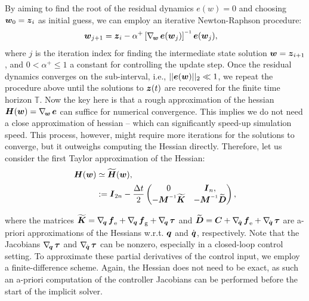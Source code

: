%
By aiming to find the root of the residual dynamics $e(w) = 0$ and choosing ${\boldsymbol{w}}_{0} = {\boldsymbol{z}}_{i}$ as initial guess, we can employ an iterative Newton-Raphson procedure:
%
\begin{align}
\wB_{j+1} & = \zB_i  - \alpha^+ \left[\grad{\wB}\eB(\wB_j)\right]\inv \eB(\wB_{j}),
\end{align}
%
where $j$ is the iteration index for finding the intermediate state solution ${\boldsymbol{w}}={\boldsymbol{z}}_{i+1}$, and $0 < \alpha^+ \le 1$ a constant for controlling the update step. Once the residual dynamics converges on the sub-interval, i.e., $||{\boldsymbol{e}}({\boldsymbol{w}})||_2 \ll 1$, we repeat the procedure above until the solutions to ${\boldsymbol{z}}(t)$ are recovered for the finite time horizon $\mathbb{T}$. Now the key here is that a rough approximation of the hessian ${\boldsymbol{H}}({\boldsymbol{w}}) = \nabla_{\!{\boldsymbol{w}}}\, {\boldsymbol{e}}$ can suffice for numerical convergence. This implies we do not need a close approximation of hessian -- which can significantly speed-up simulation speed. This process, however, might require more iterations for the solutions to converge, but it outweighs computing the Hessian directly. Therefore, let us consider the first Taylor approximation of the Hessian:
%
\begin{align}
    \HB(\wB) & \simeq \tmat{H}(\wB), \notag \\ & := \mat{I}_{2n } - \frac{\Delta t}{2} \begin{pmatrix} 0 & \mat{I}_{n},  \\
 -\mat{M} \inv \tmat{K} & -\MB\inv \tmat{D}
  \end{pmatrix},
\end{align}

\noindent where the matrices $\widetilde{\boldsymbol{K}} = \nabla_{\!{\boldsymbol{q}}}\,{\boldsymbol{f}}_{\scriptstyle\textrm{e}} + \nabla_{\!{\boldsymbol{q}}}\,{\boldsymbol{f}}_{\scriptstyle\textrm{g}} + \nabla_{\!{\boldsymbol{q}}}\,\boldsymbol{\tau}$ and $\widetilde{\boldsymbol{D}} = {\boldsymbol{C}} + \nabla_{\!{\dot{\boldsymbol{q}}}}\,{\boldsymbol{f}}_{\scriptstyle\textrm{e}} + \nabla_{\!{\dot{\boldsymbol{q}}}}\,\boldsymbol{\tau}$ are a-priori approximations of the Hessians w.r.t. ${\boldsymbol{q}}$ and ${\dot{\boldsymbol{q}}}$, respectively. Note that the Jacobians $\nabla_{\!{\boldsymbol{q}}}\,\boldsymbol{\tau}$ and $\nabla_{\!{\dot{\boldsymbol{q}}}}\,\boldsymbol{\tau}$ can be nonzero, especially in a closed-loop control setting. To approximate these partial derivatives of the control input, we employ a finite-difference scheme. Again, the Hessian does not need to be exact, as such an a-priori computation of the controller Jacobians can be performed before the start of the implicit solver.
